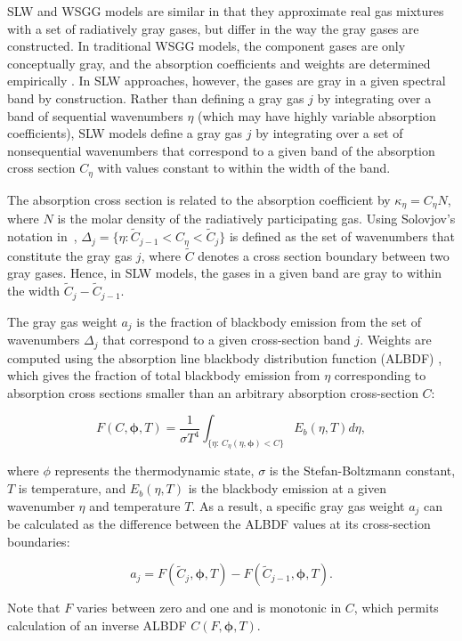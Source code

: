 \documentclass[preprint,12pt]{elsarticle}
\newcommand{\BS}{\boldsymbol}
\newcounter{bla}
\begin{document}
    SLW and WSGG models are similar in that they approximate real gas mixtures with a set of radiatively gray gases, but differ in the way the gray gases are constructed. In traditional WSGG models, the component gases are only conceptually gray, and the absorption coefficients and weights are determined empirically \citep{Badger_2019}. In SLW approaches, however, the gases are gray in a given spectral band by construction. Rather than defining a gray gas $j$ by integrating over a band of sequential wavenumbers $\eta$ (which may have highly variable absorption coefficients), SLW models define a gray gas $j$ by integrating over a set of nonsequential wavenumbers that correspond to a given band of the absorption cross section $C_{\eta}$ with values constant to within the width of the band.

    The absorption cross section is related to the absorption coefficient by $\kappa_\eta=C_\eta N$, where $N$ is the molar density of the radiatively participating gas.
%
    Using Solovjov's notation in~\cite{Solovjov_2017}, $\Delta_j=\{\eta:\tilde{C}_{j-1}<C_\eta<\tilde{C}_j\}$ is defined as the set of wavenumbers that constitute the gray gas $j$, where $\tilde{C}$ denotes a cross section boundary between two gray gases. Hence, in SLW models, the gases in a given band are gray to within the width $\tilde{C}_j-\tilde{C}_{j-1}$.

    The gray gas weight $a_j$ is the fraction of blackbody emission from the set of wavenumbers $\Delta_j$ that correspond to a given cross-section band $j$. Weights are computed using the absorption line blackbody distribution function (ALBDF) \cite{Pearson_2014}, which gives the fraction of total blackbody emission from $\eta$ corresponding to absorption cross sections smaller than an arbitrary absorption cross-section $C$:
%
    \begin{linenomath}
        \begin{equation}
            \label{e:albdf}
            F(C,\BS{\phi},T) = \frac{1}{\sigma T^4}\int_{\{\eta:\,C_\eta(\eta,\BS{\phi})<C\}}E_b(\eta,T)d\eta,
        \end{equation}
    \end{linenomath}
%
    where $\phi$ represents the thermodynamic state, $\sigma$ is the Stefan-Boltzmann constant, $T$ is temperature, and $E_b(\eta,T)$ is the blackbody emission at a given wavenumber $\eta$ and temperature $T$.
    As a result, a specific gray gas weight $a_j$ can be calculated as the difference between the ALBDF values at its cross-section boundaries:
%
    \begin{linenomath}
        \begin{equation}
            \label{e:aj}
            a_j = F(\tilde{C}_j,\BS{\phi}, T) - F(\tilde{C}_{j-1}, \BS{\phi},T).
        \end{equation}
    \end{linenomath}
%
    Note that $F$ varies between zero and one and is monotonic in $C$, which permits calculation of an inverse ALBDF $C(F,\BS{\phi},T)$.
\end{document}
